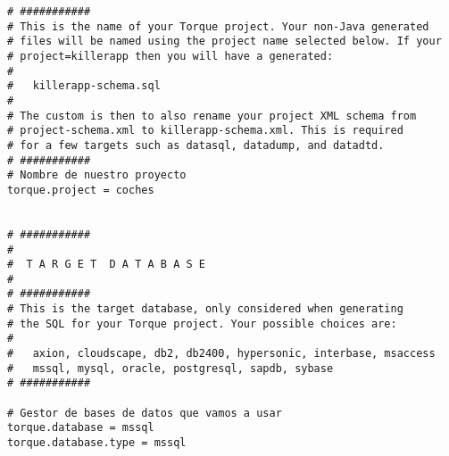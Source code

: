 \begin{lstlisting}
# ###########
# This is the name of your Torque project. Your non-Java generated
# files will be named using the project name selected below. If your
# project=killerapp then you will have a generated:
#
#   killerapp-schema.sql
#
# The custom is then to also rename your project XML schema from
# project-schema.xml to killerapp-schema.xml. This is required
# for a few targets such as datasql, datadump, and datadtd.
# ###########
# Nombre de nuestro proyecto
torque.project = coches


# ###########
#
#  T A R G E T  D A T A B A S E
#
# ###########
# This is the target database, only considered when generating
# the SQL for your Torque project. Your possible choices are:
#
#   axion, cloudscape, db2, db2400, hypersonic, interbase, msaccess
#   mssql, mysql, oracle, postgresql, sapdb, sybase
# ###########

# Gestor de bases de datos que vamos a usar
torque.database = mssql
torque.database.type = mssql



\end{lstlisting}
